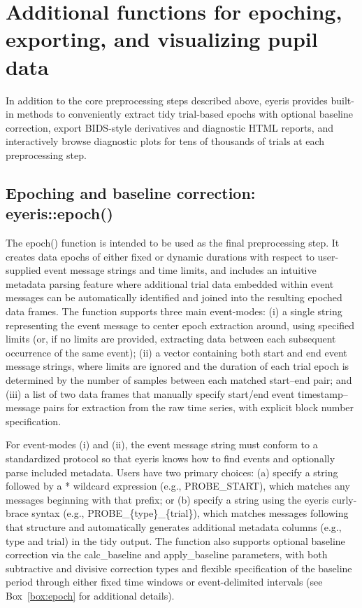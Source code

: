 \section{Additional functions for epoching, exporting, and visualizing pupil data}
In addition to the core preprocessing steps described above, eyeris provides built-in methods to conveniently extract tidy trial-based epochs with optional baseline correction, export BIDS-style derivatives and diagnostic HTML reports, and interactively browse diagnostic plots for tens of thousands of trials at each preprocessing step.

\subsection{Epoching and baseline correction: eyeris::epoch()}
The epoch() function is intended to be used as the final preprocessing step. It creates data epochs of either fixed or dynamic durations with respect to user-supplied event message strings and time limits, and includes an intuitive metadata parsing feature where additional trial data embedded within event messages can be automatically identified and joined into the resulting epoched data frames. The function supports three main event-modes: (i) a single string representing the event message to center epoch extraction around, using specified limits (or, if no limits are provided, extracting data between each subsequent occurrence of the same event); (ii) a vector containing both start and end event message strings, where limits are ignored and the duration of each trial epoch is determined by the number of samples between each matched start–end pair; and (iii) a list of two data frames that manually specify start/end event timestamp–message pairs for extraction from the raw time series, with explicit block number specification.

For event-modes (i) and (ii), the event message string must conform to a standardized protocol so that eyeris knows how to find events and optionally parse included metadata. Users have two primary choices: (a) specify a string followed by a * wildcard expression (e.g., PROBE\_START\*), which matches any messages beginning with that prefix; or (b) specify a string using the eyeris curly-brace syntax (e.g., PROBE\_\{type\}\_\{trial\}), which matches messages following that structure and automatically generates additional metadata columns (e.g., type and trial) in the tidy output. The function also supports optional baseline correction via the calc\_baseline and apply\_baseline parameters, with both subtractive and divisive correction types and flexible specification of the baseline period through either fixed time windows or event-delimited intervals (see Box~\ref{box:epoch} for additional details).

